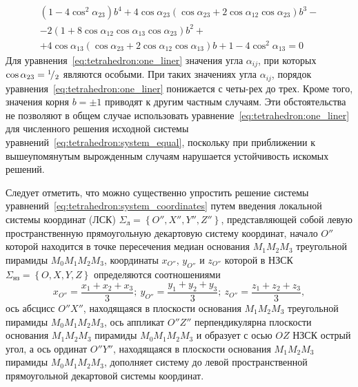 \documentclass[../main.tex]{subfiles}
\begin{document}
%
%
\begin{equation} \label{eq:tetrahedron:one_liner}
\begin{array}{l}
(1-4 \cos^2 \alpha_{23}) b^4 + 4 \cos \alpha_{23} (\cos \alpha_{23} + 2 \cos \alpha_{12} \cos \alpha_{23} ) b^3 - \\
- 2 (1 + 8 \cos \alpha_{12} \cos \alpha_{13} \cos \alpha_{23}) b^2 +
\\+ 4 \cos \alpha_{13} (\cos \alpha_{23} + 2 \cos \alpha_{12} \cos \alpha_{13}) b + 1-4 \cos^2 \alpha_{13} =0
\end{array}
\end{equation}
Для уравнения~\eqref{eq:tetrahedron:one_liner} значения угла $\alpha_{ij}$, при которых $\cos\alpha_{23} = {}^{1}\!/_{2}$ являются особыми. При таких значениях угла $\alpha_{ij}$, порядок уравнения~\eqref{eq:tetrahedron:one_liner} понижается с четы-рех до трех. Кроме того, значения корня $b = \pm 1$ приводят к другим частным случаям. Эти обстоятельства не позволяют в общем случае использовать уравнение~\eqref{eq:tetrahedron:one_liner} для численного решения исходной системы уравнений~\eqref{eq:tetrahedron:system_equal}, поскольку при приближении к вышеупомянутым вырожденным случаям нарушается устойчивость искомых решений.

Следует отметить, что можно существенно упростить решение системы уравнений~\eqref{eq:tetrahedron:system_coordinates} путем введения локальной системы координат (ЛСК) $\Sigma_{\text{л}} = \left\{O'', X'', Y'', Z''\right\}$, представляющей собой левую пространственную прямоугольную декартовую систему координат, начало $O''$ которой находится в точке пересечения медиан основания $M_1 M_2 M_3$ треугольной пирамиды $M_0 M_1 M_2 M_3$, координаты $x_{O''}$, $y_{O''}$ и $z_{O''}$ которой в НЗСК $\Sigma_{\text{нз}} = \left\{O, X, Y, Z\right\}$ определяются соотношениями
\begin{equation}
  x_{O''} = \frac{x_1 + x_2 + x_3}{3};\
  y_{O''} = \frac{y_1 + y_2 + y_3}{3};\
  z_{O''} = \frac{z_1 + z_2 + z_3}{3},
\end{equation}
ось абсцисс $O''X''$, находящаяся в плоскости основания $M_1 M_2 M_3$ треугольной пирамиды $M_0 M_1 M_2 M_3$, ось аппликат $O''Z''$ перпендикулярна плоскости основания $M_1 M_2 M_3$ пирамиды $M_0 M_1 M_2 M_3$ и образует с осью $OZ$  НЗСК острый угол, а ось ординат $O''Y''$, находящаяся в плоскости основания $M_1 M_2 M_3$ пирамиды $M_0 M_1 M_2 M_3$, дополняет систему до левой пространственной прямоугольной декартовой системы координат.
\end{document}
